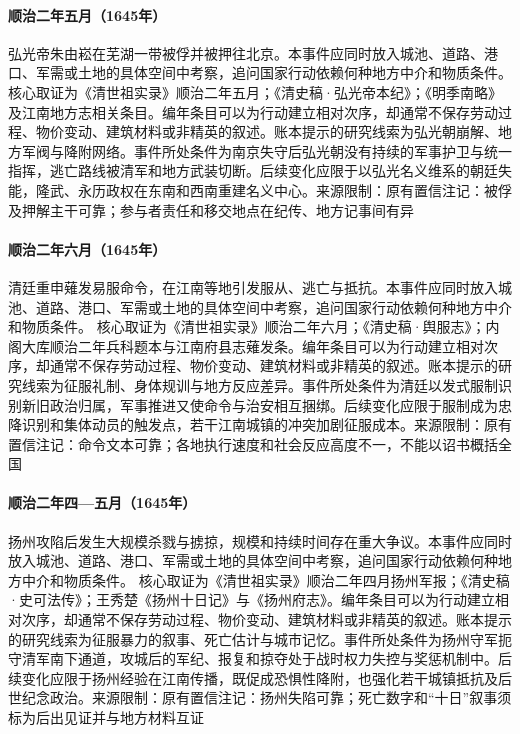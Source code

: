 \hypertarget{civic:EQ-1645-HONGGUANG-CAPTURE}{}\paragraph{顺治二年五月（1645年）}弘光帝朱由崧在芜湖一带被俘并被押往北京。本事件应同时放入城池、道路、港口、军需或土地的具体空间中考察，追问国家行动依赖何种地方中介和物质条件。 核心取证为《清世祖实录》顺治二年五月；《清史稿·弘光帝本纪》；《明季南略》及江南地方志相关条目。编年条目可以为行动建立相对次序，却通常不保存劳动过程、物价变动、建筑材料或非精英的叙述。账本提示的研究线索为弘光朝崩解、地方军阀与降附网络。事件所处条件为南京失守后弘光朝没有持续的军事护卫与统一指挥，逃亡路线被清军和地方武装切断。后续变化应限于以弘光名义维系的朝廷失能，隆武、永历政权在东南和西南重建名义中心。来源限制：原有置信注记：被俘及押解主干可靠；参与者责任和移交地点在纪传、地方记事间有异
\hypertarget{civic:EQ-1645-HAIR-ORDER}{}\paragraph{顺治二年六月（1645年）}清廷重申薙发易服命令，在江南等地引发服从、逃亡与抵抗。本事件应同时放入城池、道路、港口、军需或土地的具体空间中考察，追问国家行动依赖何种地方中介和物质条件。 核心取证为《清世祖实录》顺治二年六月；《清史稿·舆服志》；内阁大库顺治二年兵科题本与江南府县志薙发条。编年条目可以为行动建立相对次序，却通常不保存劳动过程、物价变动、建筑材料或非精英的叙述。账本提示的研究线索为征服礼制、身体规训与地方反应差异。事件所处条件为清廷以发式服制识别新旧政治归属，军事推进又使命令与治安相互捆绑。后续变化应限于服制成为忠降识别和集体动员的触发点，若干江南城镇的冲突加剧征服成本。来源限制：原有置信注记：命令文本可靠；各地执行速度和社会反应高度不一，不能以诏书概括全国
\hypertarget{civic:EQ-1645-YANGZHOU}{}\paragraph{顺治二年四—五月（1645年）}扬州攻陷后发生大规模杀戮与掳掠，规模和持续时间存在重大争议。本事件应同时放入城池、道路、港口、军需或土地的具体空间中考察，追问国家行动依赖何种地方中介和物质条件。 核心取证为《清世祖实录》顺治二年四月扬州军报；《清史稿·史可法传》；王秀楚《扬州十日记》与《扬州府志》。编年条目可以为行动建立相对次序，却通常不保存劳动过程、物价变动、建筑材料或非精英的叙述。账本提示的研究线索为征服暴力的叙事、死亡估计与城市记忆。事件所处条件为扬州守军扼守清军南下通道，攻城后的军纪、报复和掠夺处于战时权力失控与奖惩机制中。后续变化应限于扬州经验在江南传播，既促成恐惧性降附，也强化若干城镇抵抗及后世纪念政治。来源限制：原有置信注记：扬州失陷可靠；死亡数字和“十日”叙事须标为后出见证并与地方材料互证
